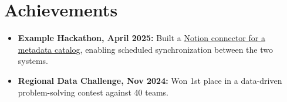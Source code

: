 \documentclass[10pt, letterpaper]{article}
\newcommand{\achieveItem}[1]{
  \item\normalsize{#1}
}
\begin{document}
\section{Achievements}

\begin{itemize}[leftmargin=0.15in, itemsep=3pt, topsep=3pt]

\achieveItem{\textbf{Example Hackathon, April 2025:} Built a \href{https://github.com/jordandoe/metadata-connector}{Notion connector for a metadata catalog}, enabling scheduled synchronization between the two systems.}

\achieveItem{\textbf{Regional Data Challenge, Nov 2024:} Won 1st place in a data-driven problem-solving contest against 40 teams.}

\end{itemize}
\end{document}
